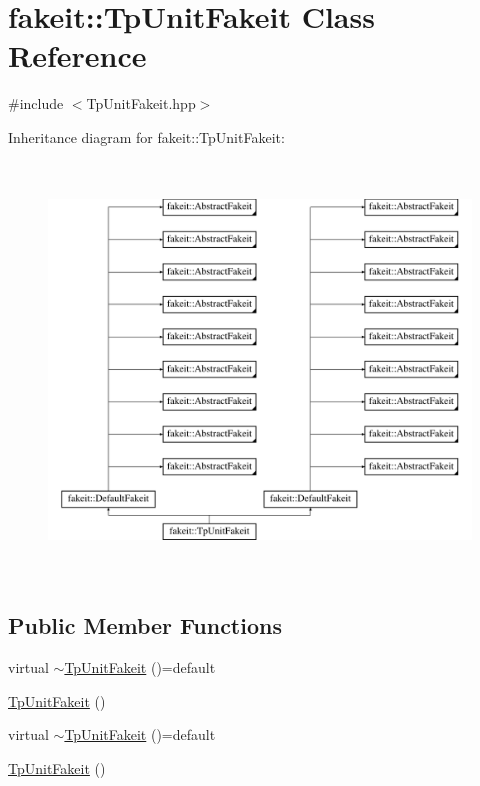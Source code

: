 \hypertarget{classfakeit_1_1TpUnitFakeit}{}\section{fakeit\+::Tp\+Unit\+Fakeit Class Reference}
\label{classfakeit_1_1TpUnitFakeit}


{\ttfamily \#include $<$Tp\+Unit\+Fakeit.\+hpp$>$}

Inheritance diagram for fakeit\+::Tp\+Unit\+Fakeit\+:\begin{figure}[H]
\begin{center}
\leavevmode
\includegraphics[height=11.000000cm]{classfakeit_1_1TpUnitFakeit}
\end{center}
\end{figure}
\subsection*{Public Member Functions}
\begin{DoxyCompactItemize}
\item 
virtual \mbox{\hyperlink{classfakeit_1_1TpUnitFakeit_ab46207ba99073817bc69acd834f0be76}{$\sim$\+Tp\+Unit\+Fakeit}} ()=default
\item 
\mbox{\hyperlink{classfakeit_1_1TpUnitFakeit_a1fbc6be577c24dbbfdfa30613dcaa46b}{Tp\+Unit\+Fakeit}} ()
\item 
virtual \mbox{\hyperlink{classfakeit_1_1TpUnitFakeit_ab46207ba99073817bc69acd834f0be76}{$\sim$\+Tp\+Unit\+Fakeit}} ()=default
\item 
\mbox{\hyperlink{classfakeit_1_1TpUnitFakeit_a1fbc6be577c24dbbfdfa30613dcaa46b}{Tp\+Unit\+Fakeit}} ()
\end{DoxyCompactItemize}
